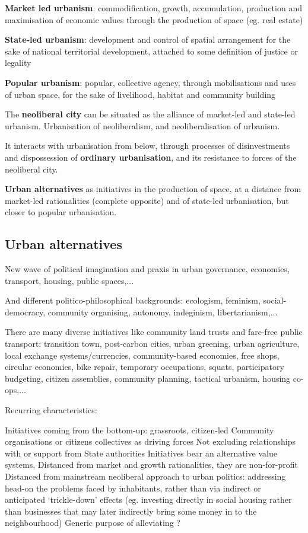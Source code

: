 \documentclass{article}
\begin{document}
\textbf{Market led urbanism}: commodification, growth, accumulation, production and maximisation of economic values through the production of space (eg. real estate)

\textbf{State-led urbanism}: development and control of spatial arrangement for the sake of national territorial development, attached to some definition of justice or legality

\textbf{Popular urbanism}: popular, collective agency, through mobilisations and uses of urban space, for the sake of livelihood, habitat and community building

The \textbf{neoliberal city} can be situated as the alliance of market-led and state-led urbanism.
Urbanisation of neoliberalism, and neoliberalisation of urbanism.

It interacts with urbanisation from below, through processes of disinvestments and dispossession of \textbf{ordinary urbanisation}, and its resistance to forces of the neoliberal city.

\textbf{Urban alternatives} as initiatives in the production of space, at a distance from market-led rationalities (complete opposite) and of state-led urbanisation, but closer to popular urbanisation.

\subsection{Urban alternatives}

New wave of political imagination and praxis in urban governance, economies, transport, housing, public spaces,...

And different politico-philosophical backgrounds: ecologism, feminism, social-democracy, community organising, autonomy, indeginism, libertarianism,...

There are many diverse initiatives like community land trusts and fare-free public transport: transition town, post-carbon cities, urban greening, urban agriculture, local exchange systems/currencies, community-based economies, free shops, circular economies, bike repair, temporary occupations, squats, participatory budgeting, citizen assemblies, community planning, tactical urbanism, housing co-ops,...

Recurring characteristics:

\begin{outline}
	\1 Initiatives coming from the bottom-up: grassroots, citizen-led
		\2 Community organisations or citizens collectives as driving forces
		\2 Not excluding relationships with or support from State authorities
	\1 Initiatives bear an alternative value systems, 
		\2 Distanced from market and growth rationalities, they are non-for-profit
		\2 Distanced from mainstream neoliberal approach to urban politics: addressing head-on the problems faced by inhabitants, rather than via indirect or anticipated `trickle-down' effects (eg. investing directly in social housing rather than businesses that may later indirectly bring some money in to the neighbourhood)
	\1 Generic purpose  of alleviating ?
\end{outline}
\end{document}
